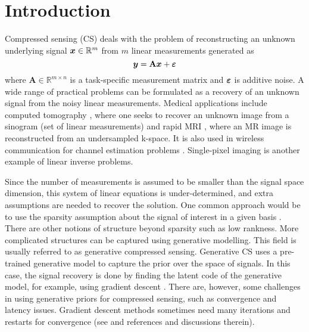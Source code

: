 

\section{Introduction}
Compressed sensing (CS) deals with the problem of reconstructing an unknown underlying signal ${\bm{x}} \in \mathbb{R}^m$ from $m$ linear measurements generated as
\begin{equation} \label{eq:cs_main}
    \vy = \mathbf{A}\vx + \vepsilon
\end{equation}
where $\mathbf{A} \in \mathbb{R}^{m\times n}$ is a task-specific measurement matrix and ${\bm{\varepsilon}}$ is additive noise. A wide range of practical problems can be formulated as a recovery of an unknown signal from the noisy linear measurements.
Medical applications include computed tomography \citep{chen2008prior}, where one seeks to recover an unknown image from a sinogram (set of linear measurements) and rapid MRI \citep{lustig2007sparse}, where an MR image is reconstructed from an undersampled k-space. It is also used in wireless communication for channel estimation problems \citep{paredes2007ultra}. Single-pixel imaging \citep{duarte2008single} is another example of linear inverse problems.

Since the number of measurements is assumed to be smaller than the signal space dimension, this system of linear equations is under-determined, and extra assumptions are needed to recover the solution. One common approach would be to use the sparsity assumption about the signal of interest in a given basis \citep{tibshirani1996regression,candes_stable_2006,donoho_compressed_2006}. There are other notions of structure beyond sparsity such as low rankness. More complicated structures can be captured using generative modelling. This field is usually referred to as generative compressed sensing. Generative CS  uses a pre-trained generative model to capture the prior over the space of signals. In this case, the signal recovery is done by finding the latent code of the generative model, for example, using gradient descent \cite{Bora2017-as}. There are, however, some challenges in using generative priors for compressed sensing, such as convergence and latency issues. Gradient descent methods sometimes need many iterations and restarts for convergence (see \citet{Whang2021-if} and references and discussions therein).

